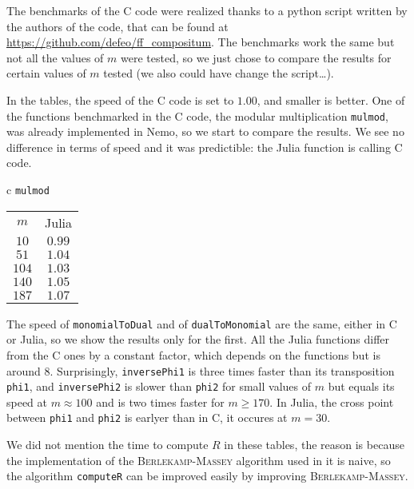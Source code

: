 \documentclass[a4paper,11pt]{article}
\theoremstyle{break}
\theoremstyle{definition}
\theoremstyle{remark}
\begin{document}
The benchmarks of the C code were realized thanks to a python 
script written by the authors of the code, that can be found at 
\url{https://github.com/defeo/ff\_compositum}. The benchmarks work the same but not 
all the values of $m$ were tested, so we just chose to compare the results for 
certain values of $m$ tested (we also could have change the script\dots).

In the tables, the speed of
the C code is set to $1.00$, and smaller is better. One of the functions 
benchmarked in the C code, the modular multiplication \texttt{mulmod}, was 
already implemented in Nemo, so we start to compare the results. We see no
difference in terms of speed and it was predictible: the Julia
function is calling C code.

\begin{center}
  \begin{tabular}[here]{c}
    \texttt{mulmod} \\
    \begin{tabular}[here]{cc}
   $m$ & Julia \\
   $10$ & $0.99$\\
   $51$ & $1.04$\\
   $104$ & $1.03$\\
   $140$ & $1.05$\\
   $187$ & $1.07$\\
    \end{tabular}
  \end{tabular}
\end{center}
The speed of \texttt{monomialToDual} and of \texttt{dualToMonomial} are the 
same, either in C or Julia, so we show the results only for the first.
All the Julia functions differ from the C ones by a
constant factor, which depends on the functions but is around $8$.
Surprisingly, \texttt{inversePhi1} is three times faster than its transposition
\texttt{phi1}, and \texttt{inversePhi2} is slower than \texttt{phi2} for small
values of $m$ but equals its speed at $m\approx 100$ and is two times faster for $m\geq170$.
In Julia, the cross point between \texttt{phi1} and \texttt{phi2} is earlyer than
in C, it occures at $m=30$.

We did not mention the time to compute $R$ in these tables, the reason 
is because the implementation of the \textsc{Berlekamp-Massey} algorithm used 
in it is naive, so the algorithm \texttt{computeR} can be improved easily by 
improving \textsc{Berlekamp-Massey}.
\end{document}
